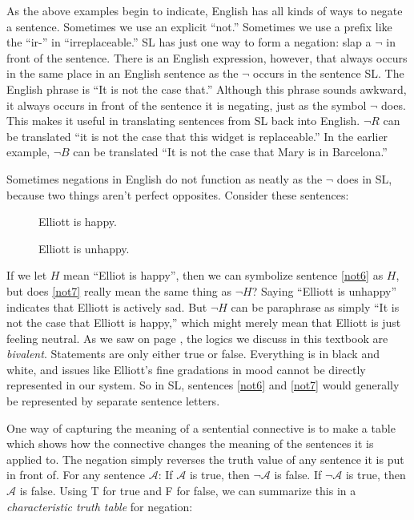 As the above examples begin to indicate, English has all kinds of ways to negate a sentence.  Sometimes we use an explicit ``not.'' Sometimes we use a prefix like the ``ir-'' in ``irreplaceable.'' SL has just one way to form a negation: slap a $\lnot$ in front of the sentence. There is an English expression, however, that always occurs in the same place in an English sentence as the $\lnot$ occurs in the sentence SL. The English phrase is ``It is not the case that.'' Although this phrase sounds awkward, it always occurs in front of the sentence it is negating, just as the symbol $\lnot$ does. This makes it useful in translating sentences from SL back into English. $\lnot R$ can be translated ``it is not the case that this widget is replaceable.'' In the earlier example, $\lnot B$ can be translated ``It is not the case that Mary is in Barcelona.''


Sometimes negations in English do not function as neatly as the $\lnot$ does in SL, because two things aren't perfect opposites. Consider these sentences:

\begin{description}
\item[] Elliott is happy.
\item[] Elliott is unhappy.
\end{description}


If we let $H$ mean ``Elliot is happy'', then we can symbolize sentence \ref{not6} as $H$, but does \ref{not7} really mean the same thing as $\lnot H$? Saying ``Elliott is unhappy'' indicates that Elliott is actively sad. But $\lnot H$ can be paraphrase as simply ``It is not the case that Elliott is happy,'' which might merely mean that Elliott is just feeling neutral. As we saw on page \pageref{def:bivalent}, the logics we discuss in this textbook are \emph{bivalent}. Statements are only either true or false. Everything is in black and white, and issues like Elliott's fine gradations in mood cannot be directly represented in our system. So in SL, sentences \ref{not6} and  \ref{not7} would generally be represented by separate sentence letters.

One way of capturing the meaning of a sentential connective is to make a table which shows how the connective changes the meaning of the sentences it is applied to. The negation simply reverses the truth value of any sentence it is put in front of. For any sentence $\mathcal{A}$: If $\mathcal{A}$ is true, then $\lnot\mathcal{A}$ is false. If $\lnot\mathcal{A}$ is true, then $\mathcal{A}$ is false. Using T for true and F for false, we can summarize this in a \emph{characteristic truth table} for negation:

